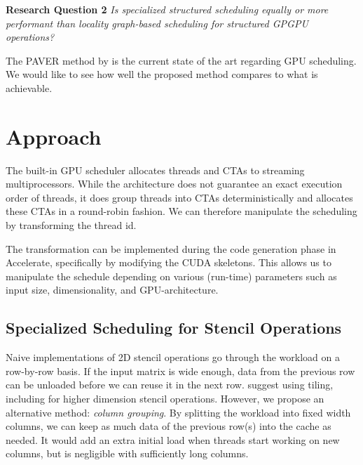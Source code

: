 \documentclass{article}
\begin{document}
\begin{mdframed}
    \textbf{Research Question 2}
    \emph{Is specialized structured scheduling equally or more performant than locality graph-based scheduling for structured GPGPU operations?}
\end{mdframed}
The PAVER method by \citet{tripathy2021paver} is the current state of the art regarding GPU scheduling.
We would like to see how well the proposed method compares to what is achievable.

\section{Approach}
The built-in GPU scheduler allocates threads and CTAs to streaming multiprocessors.
While the architecture does not guarantee an exact execution order of threads, it does group threads into CTAs deterministically and allocates these CTAs in a round-robin fashion.
We can therefore manipulate the scheduling by transforming the thread id.

The transformation can be implemented during the code generation phase in Accelerate, specifically by modifying the CUDA skeletons.
This allows us to manipulate the schedule depending on various (run-time) parameters such as input size, dimensionality, and GPU-architecture.

\subsection{Specialized Scheduling for Stencil Operations}
\label{sec:stencil_schedule}
Naive implementations of 2D stencil operations go through the workload on a row-by-row basis.
If the input matrix is wide enough, data from the previous row can be unloaded before we can reuse it in the next row.
\citet{rivera2000tiling} suggest using tiling, including for higher dimension stencil operations. 
However, we propose an alternative method: \emph{column grouping}.
By splitting the workload into fixed width columns, we can keep as much data of the previous row(s) into the cache as needed.
It would add an extra initial load when threads start working on new columns, but is negligible with sufficiently long columns.
\end{document}
